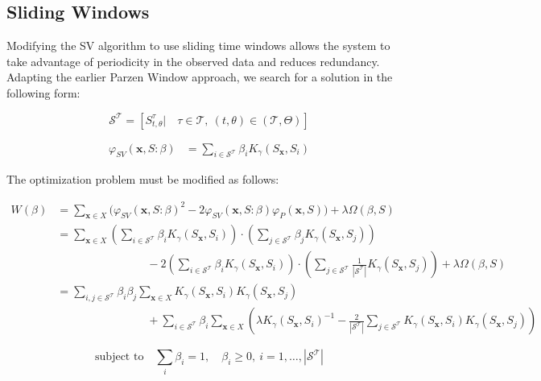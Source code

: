 \documentclass[10pt]{article}
\begin{document}
\subsection{ Sliding Windows }

Modifying the SV algorithm to use sliding time windows allows the system to take advantage of periodicity in the observed data and reduces redundancy.  Adapting the earlier Parzen Window approach, we search for a solution in the following form:

\[
\mathcal{S}^{\mathcal{T}} = [ S_{t,\theta}^\tau | \quad \tau \in \mathcal{T}, \ (t,\theta) \in (\mathcal{T},\Theta) ]
\]

\begin{align} \label{eq:SVResultSlidingSingle}
\varphi_{SV}( \mathbf{x}, S : \beta) &= \sum_{i \in \mathcal{S}^\mathcal{T}} \beta_i K_\gamma( S_\mathbf{x}, S_i ) 
\end{align}

The optimization problem must be modified as follows:

\begin{align*}
W(\beta) &= \sum_{ \mathbf{x} \in X } \Big( \varphi_{SV}(\mathbf{x},S : \beta)^2 - 2 \varphi_{SV}(\mathbf{x},S : \beta) \varphi_P(\mathbf{x},S)  \Big)  + \lambda \Omega( \beta, S ) \\
&= \sum_{ \mathbf{x} \in X } \left( \sum_{i \in \mathcal{S}^{\mathcal{T}}} \beta_i K_\gamma( S_{\mathbf{x}}, S_i ) \right) \cdot \left( \sum_{j \in \mathcal{S}^{\mathcal{T}}} \beta_j K_\gamma( S_{\mathbf{x}}, S_j ) \right) \\
& \qquad \qquad \qquad \qquad - 2 \left( \sum_{i \in \mathcal{S}^{\mathcal{T}}} \beta_i K_\gamma( S_{\mathbf{x}}, S_i ) \right) \cdot \left( \sum_{j \in \mathcal{S}^{\mathcal{T}}} \frac{1}{|\mathcal{S}^{\mathcal{T}}|} K_\gamma( S_{\mathbf{x}}, S_j ) \right)  + \lambda \Omega( \beta,S ) \\
&= \sum_{i,j \in \mathcal{S}^{\mathcal{T}}} \beta_i \beta_j \sum_{\mathbf{x} \in X} K_\gamma(S_{\mathbf{x}},S_i) K_\gamma(S_{\mathbf{x}},S_j) \\
& \qquad \qquad \qquad \qquad + \sum_{i \in \mathcal{S}^{\mathcal{T}}} \beta_i \sum_{\mathbf{x} \in X } \left( \lambda K_\gamma(S_{\mathbf{x}},S_i)^{-1} - \frac{2}{|\mathcal{S}^{\mathcal{T}}|} \sum_{j \in \mathcal{S}^{\mathcal{T}}} K_\gamma(S_{\mathbf{x}},S_i) K_\gamma(S_{\mathbf{x}},S_j) \right)
\end{align*}

\begin{equation} \text{subject to} \quad \sum_i \beta_i = 1, \quad \beta_i \ge 0, \ i=1,\hdots,|\mathcal{S}^{\mathcal{T}}|
\end{equation}
\end{document}
